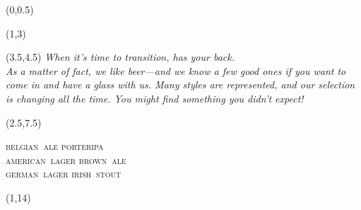 \documentclass[a0,portrait]{a0poster}
\let\oldhuge\huge
\renewcommand{\normalsize}{\oldhuge}
\let\oldVERYHuge\VERYHuge
\renewcommand{\LARGE}{\oldVERYHuge}
\begin{document}

\begin{textblock}{14}(0,0.5)
\end{textblock}

\begin{textblock}{13}(1,3)
\end{textblock}

\begin{textblock}{8}(3.5,4.5)
  \centering
  \normalsize
  \textit{
  When it's time to transition, \FLOW has your back.\\
  As a matter of fact, we like beer---and we know a few good ones if you want to come in and have a glass with us. 
  Many styles are represented, and our selection is changing all the time. 
  You might find something you didn't expect!
  }
\end{textblock}

\begin{textblock}{10}(2.5,7.5)
  \centering
   
   \textsc{\LARGE
   belgian~ale\flowtherefore
   porter\flowtherefore ipa\\
   american~lager\flowtherefore
   brown~ale\\
   german~lager\flowtherefore
   irish~stout\\
   }
\end{textblock}

\begin{textblock}{13}(1,14)
\end{textblock}


\end{document}
